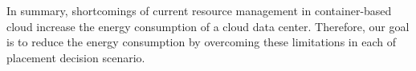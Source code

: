 In summary, shortcomings of current resource management in container-based cloud increase the energy consumption of a cloud data center. Therefore, our goal is to reduce the energy consumption by overcoming these limitations in each of placement decision scenario.













